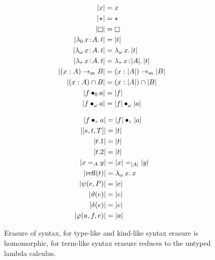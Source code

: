 

\begin{figure}
    \centering
    \begin{minipage}{0.5\textwidth}
        \begin{align*}
            |x| &= x \\
            |\!\star\!| &= \star \\
            |\kind| &= \kind \\
            |\abs{\lambda_0}{x}{A}{t}| &= |t| \\
            |\abs{\lambda_\omega}{x}{A}{t}| &= \absu{\lambda_\omega}{x}{|t|} \\
            |\abs{\lambda_\tau}{x}{A}{t}| &= \abs{\lambda_\tau}{x}{|A|}{|t|} \\
            |(x:A) \to_m B| &= (x:|A|) \to_m |B| \\
            |(x:A) \cap B| &= (x:|A|) \cap |B| \\
            |\app{f}{0}{a}| &= |f| \\
            |\app{f}{\omega}{a}| &= \app{|f|}{\omega}{|a|}
        \end{align*}
    \end{minipage}%
    \begin{minipage}{0.5\textwidth}
        \begin{align*}
            |f \bullet_{\tau} a| &= |f| \bullet_{\tau} |a| \\
            |[s, t, T]| &= |t| \\
            |t.1| &= |t| \\
            |t.2| &= |t| \\
            |x =_A y| &= |x| =_{|A|} |y| \\
            |\text{refl}(t)| &= {\lambda_\omega}\, x.\, x \\
            |\psi(e, P)| &= |e| \\
            |\vartheta(e)| &= |e| \\
            |\delta(e)| &= |e| \\
            |\varphi(a,f,e)| &= |a|
        \end{align*}
    \end{minipage}
    \caption{Erasure of syntax, for type-like and kind-like syntax erasure is homomorphic, for term-like syntax erasure reduces to the untyped lambda calculus.}
\end{figure}
